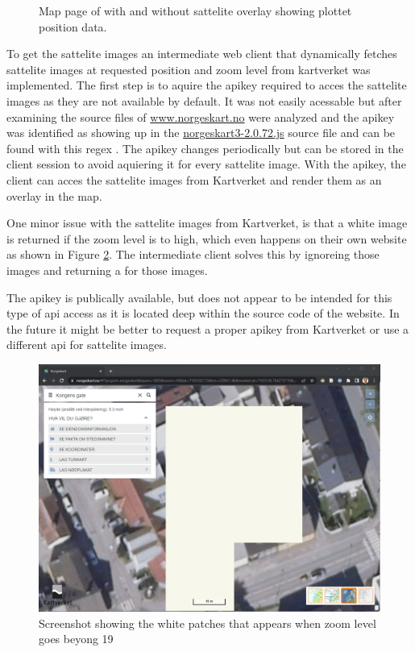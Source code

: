 \begin{figure}[H]
    \caption{Map page of \srgui with and without sattelite overlay showing plottet position data.}
    \label{fig:gui_map}
\end{figure}

To get the sattelite images an intermediate web client that dynamically fetches sattelite images at requested position and zoom level from kartverket was implemented.
The first step is to aquire the \gls{apikey} required to acces the sattelite images as they are not available by default.
It was not easily acessable but after examining the source files of \href{https://www.norgeskart.no}{www.norgeskart.no} were analyzed and the \gls{apikey} was identified as showing up in the \href{https://www.norgeskart.no/norgeskart3-2.0.72.js}{norgeskart3-2.0.72.js} source file and can be found with this regex .
The \gls{apikey} changes periodically but can be stored in the client session to avoid aquiering it for every sattelite image.
With the \gls{apikey}, the client can acces the sattelite images from Kartverket and render them as an overlay in the map.

One minor issue with the sattelite images from Kartverket, is that a white image is returned if the zoom level is to high, which even happens on their own website as shown in Figure \ref{fig:norgeskart_bug}.
The intermediate client solves this by ignoreing those images and returning a  for those images.

The \gls{apikey} is publically available, but does not appear to be intended for this type of \gls{api} access as it is located deep within the source code of the website.
In the future it might be better to request a proper \gls{apikey} from Kartverket or use a different \gls{api} for sattelite images.

\begin{figure}[H]
    \centering
    \includegraphics[width=.8\textwidth]{figures/gui/norgeskart_bug.png}
    \caption{Screenshot showing the white patches that appears when zoom level goes beyong 19 \cite{kartverketNorgeskart}}
    \label{fig:norgeskart_bug}
\end{figure}
